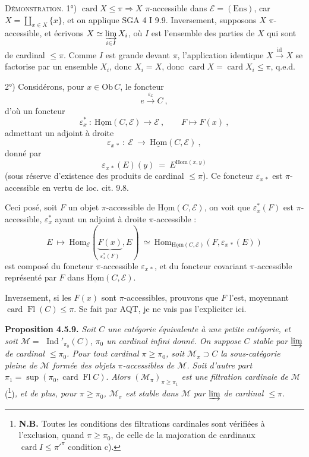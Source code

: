 \documentclass[11pt]{article}
\newcommand{\printedpage}[1]{\if\relax\detokenize{#1}\relax\else\marginpar{\footnotesize p.~#1}\fi}
\newcommand{\msp}[1]{\marginpar{\footnotesize [#1]}}
\newcommand{\uHom}{\underline{\mathrm{Hom}}}
\newcommand{\Ens}{\mathrm{Ens}}
\newcommand{\Hom}{\mathrm{Hom}}
\newcommand{\Ob}{\mathrm{Ob}\,}
\newcommand{\card}{\operatorname{card}}
\newcommand{\Fl}{\operatorname{Fl}}
\newcommand{\Ind}{\operatorname{Ind}}
\begin{document}
\textsc{Démonstration.} 1°) $\card X \leqslant \pi \Longrightarrow X$ $\pi$-accessible dans $\mathcal{E} = (\Ens)$, car $X = \coprod_{x \in X} \{x\}$, et on applique SGA 4 I 9.9. Inversement, supposons $X$ $\pi$-accessible, et écrivons $X \simeq \varinjlim\limits_{i \in I} X_i$, où $I$ est l'ensemble des parties de $X$ qui sont de cardinal $\leqslant \pi$. Comme $I$ est grande devant $\pi$, l'application identique $X \xrightarrow{\ \mathrm{id}\ } X$ se factorise par un ensemble $X_i$, donc $X_i = X$, donc $\card X = \card X_i \leqslant \pi$, q.e.d.

\msp{page 120}

2°) Considérons, pour $x \in \Ob C$, le foncteur
\[
e \xrightarrow{\ \varepsilon_x\ } C \ ,
\]
d'où un foncteur
\[
\varepsilon_x^* \ : \ \uHom(C,\mathcal{E}) \longrightarrow \mathcal{E} \ , \qquad F \longmapsto F(x) \ ,
\]
admettant un adjoint à droite
\[
\varepsilon_{x\,*} \ : \ \mathcal{E} \ \longrightarrow \ \uHom(C,\mathcal{E}) \ ,
\]
donné par
\[
\varepsilon_{x\,*}(E)(y) \ = \ E^{\Hom(x,y)}
\]
(sous réserve d'existence des produits de cardinal $\leqslant \pi$). Ce foncteur $\varepsilon_{x\,*}$ est $\pi$-accessible en vertu de loc. cit. 9.8.

Ceci posé, soit $F$ un objet $\pi$-accessible de $\uHom(C,\mathcal{E})$, on voit que $\varepsilon_x^*(F)$ est $\pi$-accessible, $\varepsilon_x^*$ ayant un adjoint à droite $\pi$-accessible :
\[
E \ \longmapsto \ \Hom_{\mathcal{E}}(\underbrace{F(x)}_{\varepsilon_x^*(F)}, E) \ \simeq \ \Hom_{\uHom(C,\mathcal{E})}(F, \varepsilon_{x\,*}(E))
\]
\printedpage{36}
est composé du foncteur $\pi$-accessible $\varepsilon_{x\,*}$, et du foncteur covariant $\pi$-accessible représenté par $F$ dans $\uHom(C,\mathcal{E})$.

Inversement, si les $F(x)$ sont $\pi$-accessibles, prouvons que $F$ l'est, moyennant $\card \Fl(C) \leqslant \pi$. Se fait par AQT, je ne vais pas l'expliciter ici.

\msp{page 121}

\textbf{Proposition 4.5.9.} \textit{Soit $C$ une catégorie équivalente à une petite catégorie, et soit $\mathcal{M} = $} $\Ind'_{\pi_0}(C)$, \textit{$\pi_0$ un cardinal infini donné. On suppose $C$ stable par $\varinjlim$ de cardinal $\leqslant \pi_0$. Pour tout cardinal $\pi \geqslant \pi_0$, soit $\mathcal{M}_\pi \supset C$ la sous-catégorie pleine de $\mathcal{M}$ formée des objets $\pi$-accessibles de $\mathcal{M}$. Soit d'autre part} $\pi_1 = \sup(\pi_0, \card \Fl C)$. \textit{Alors $(\mathcal{M}_\pi)_{\pi \geqslant \pi_1}$ est une filtration cardinale de $\mathcal{M}$} (\footnote{\textbf{N.B.} Toutes les conditions des filtrations cardinales sont vérifiées à l'exclusion, quand $\pi \geqslant \pi_0$, de celle de la majoration de cardinaux $\card I \leqslant \pi'^{\pi}$ condition c).})\textit{, et de plus, pour $\pi \geqslant \pi_0$, $\mathcal{M}_\pi$ est stable dans $\mathcal{M}$ par $\varinjlim$ de cardinal $\leqslant \pi$.}
\end{document}
